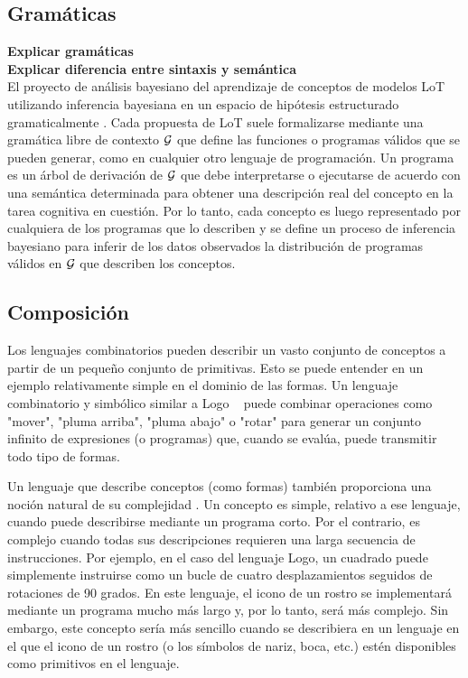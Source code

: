 \subsection{Gramáticas}


\textbf{Explicar gramáticas}\\
\textbf{Explicar diferencia entre sintaxis y semántica}\\

El proyecto de análisis bayesiano del aprendizaje de conceptos de modelos LoT utilizando inferencia bayesiana en un espacio de hipótesis estructurado gramaticalmente \cite{goodman2008rational}. Cada propuesta de LoT suele formalizarse mediante una gramática libre de contexto $ \gram $ que define las funciones o programas válidos que se pueden generar, como en cualquier otro lenguaje de programación. Un programa es un árbol de derivación de $ \gram $ que debe interpretarse o ejecutarse de acuerdo con una semántica determinada para obtener una descripción real del concepto en la tarea cognitiva en cuestión. Por lo tanto, cada concepto es luego representado por cualquiera de los programas que lo describen y se define un proceso de inferencia bayesiano para inferir de los datos observados la distribución de programas válidos en $ \gram $ que describen los conceptos.

\subsection{Composición}
Los lenguajes combinatorios pueden describir un vasto conjunto de conceptos a partir de un pequeño conjunto de primitivas. Esto se puede entender en un ejemplo relativamente simple en el dominio de las formas. Un lenguaje combinatorio y simbólico similar a Logo ~\cite{abelson1974logo} puede combinar operaciones como "mover", "pluma arriba", "pluma abajo" o "rotar" para generar un conjunto infinito de expresiones (o programas) que, cuando se evalúa, puede transmitir todo tipo de formas.

Un lenguaje que describe conceptos (como formas) también proporciona una noción natural de su complejidad \cite{kolmogorov1968three}. Un concepto es simple, relativo a ese lenguaje, cuando puede describirse mediante un programa corto. Por el contrario, es complejo cuando todas sus descripciones requieren una larga secuencia de instrucciones. Por ejemplo, en el caso del lenguaje Logo, un cuadrado puede simplemente instruirse como un bucle de cuatro desplazamientos seguidos de rotaciones de 90 grados. En este lenguaje, el icono de un rostro se implementará mediante un programa mucho más largo y, por lo tanto, será más complejo. Sin embargo, este concepto sería más sencillo cuando se describiera en un lenguaje en el que el icono de un rostro (o los símbolos de nariz, boca, etc.) estén disponibles como primitivos en el lenguaje.

